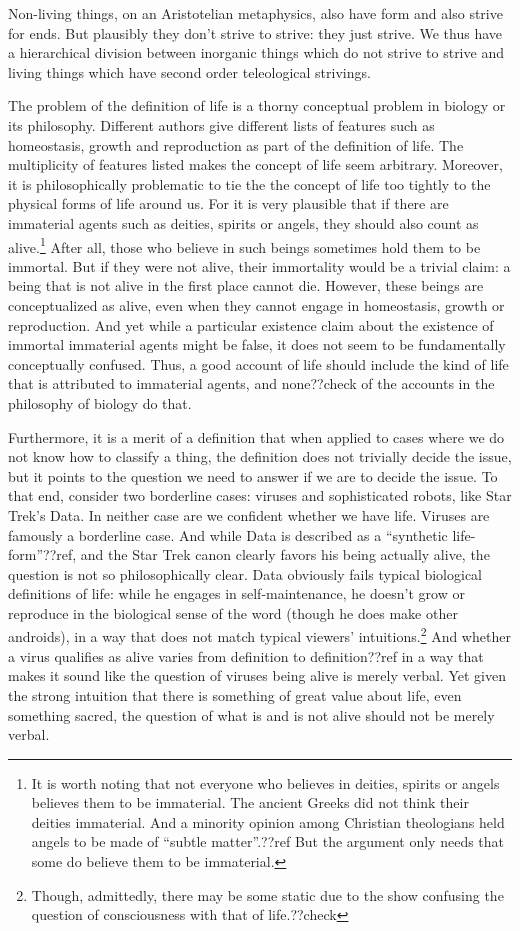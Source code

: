 Non-living things, on an Aristotelian metaphysics, also have form and also strive for ends. But plausibly they don't strive to strive: they just strive.
We thus have a hierarchical division between inorganic things which do not strive to strive and living things which have second order teleological strivings.

The problem of the definition of life is a thorny conceptual problem in biology or its philosophy. Different authors give different lists of features such
as homeostasis, growth and reproduction as part of the definition of life. The multiplicity of features listed makes the concept of life seem arbitrary.
Moreover, it is philosophically problematic to tie the the concept of life too tightly to the physical forms of life around us. For it is very plausible
that if there are immaterial agents such as deities, spirits or angels, they should also count as alive.\footnote{It is worth noting that not everyone who
believes in deities, spirits or angels believes them to be immaterial. The ancient Greeks did not think their deities immaterial. And a minority opinion
among Christian theologians held angels to be made of ``subtle matter''.??ref But the argument only needs that some do believe them to be immaterial.}
 After all, those who believe in such beings sometimes
hold them to be immortal. But if they were not alive, their immortality would be a trivial claim: a being that is not alive in the first place cannot die.
However, these beings are conceptualized as alive, even when they cannot engage in homeostasis, growth or reproduction. And yet while a particular existence
claim about the existence of immortal immaterial agents might be false, it does not seem to be fundamentally conceptually confused. Thus, a good account
of life should include the kind of life that is attributed to immaterial agents, and none??check of the accounts in the philosophy of biology do that.

Furthermore, it is a merit of a definition that when applied to cases where we do not know how to classify a thing, the definition does not trivially
decide the issue, but it points to the question we need to answer if we are to decide the issue. To that end, consider two borderline cases: viruses
and sophisticated robots, like Star Trek's Data. In neither case are we confident whether we have life. Viruses are famously a borderline case.
And while Data is described as a ``synthetic life-form''??ref, and the Star Trek canon clearly favors his being actually alive, the question is
not so philosophically clear. Data obviously fails typical biological definitions of life: while he engages in self-maintenance, he doesn't grow or
reproduce in the biological sense of the word (though he does make other androids), in a way that does not match typical viewers' intuitions.\footnote{Though,
admittedly, there may be some static due to the show confusing the question of consciousness with that of life.??check} And
whether a virus qualifies as alive varies from definition
to definition??ref in a way that makes it sound like the question of viruses being alive is merely verbal. Yet given the strong intuition that there
is something of great value about life, even something sacred, the question of what is and is not alive should not be merely verbal.

